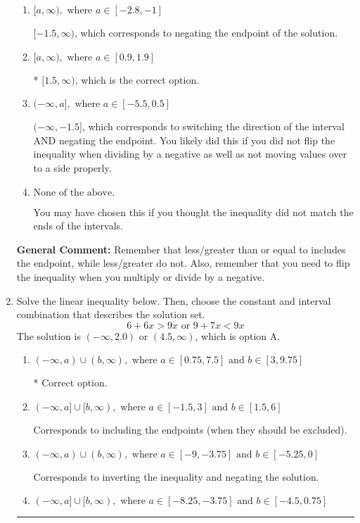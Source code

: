 \documentclass{extbook}[14pt]
\newcommand{\litem}[1]{\item #1

\rule{\textwidth}{0.4pt}}
\begin{document}
\begin{enumerate}
{\begin{enumerate}[label=\Alph*.]
 $(-\infty, 1.5]$, which corresponds to switching the direction of the interval. You likely did this if you did not flip the inequality when dividing by a negative!
\item \( [a, \infty), \text{ where } a \in [-2.8, -1] \)

 $[-1.5, \infty)$, which corresponds to negating the endpoint of the solution.
\item \( [a, \infty), \text{ where } a \in [0.9, 1.9] \)

* $[1.5, \infty)$, which is the correct option.
\item \( (-\infty, a], \text{ where } a \in [-5.5, 0.5] \)

 $(-\infty, -1.5]$, which corresponds to switching the direction of the interval AND negating the endpoint. You likely did this if you did not flip the inequality when dividing by a negative as well as not moving values over to a side properly.
\item \( \text{None of the above}. \)

You may have chosen this if you thought the inequality did not match the ends of the intervals.
\end{enumerate}

\textbf{General Comment:} Remember that less/greater than or equal to includes the endpoint, while less/greater do not. Also, remember that you need to flip the inequality when you multiply or divide by a negative.
}
\litem{
Solve the linear inequality below. Then, choose the constant and interval combination that describes the solution set.
\[ 6 + 6 x > 9 x \text{ or } 9 + 7 x < 9 x \]The solution is \( (-\infty, 2.0) \text{ or } (4.5, \infty) \), which is option A.\begin{enumerate}[label=\Alph*.]
\item \( (-\infty, a) \cup (b, \infty), \text{ where } a \in [0.75, 7.5] \text{ and } b \in [3, 9.75] \)

 * Correct option.
\item \( (-\infty, a] \cup [b, \infty), \text{ where } a \in [-1.5, 3] \text{ and } b \in [1.5, 6] \)

Corresponds to including the endpoints (when they should be excluded).
\item \( (-\infty, a) \cup (b, \infty), \text{ where } a \in [-9, -3.75] \text{ and } b \in [-5.25, 0] \)

Corresponds to inverting the inequality and negating the solution.
\item \( (-\infty, a] \cup [b, \infty), \text{ where } a \in [-8.25, -3.75] \text{ and } b \in [-4.5, 0.75] \)


\end{enumerate}}
\end{enumerate}
\end{document}

